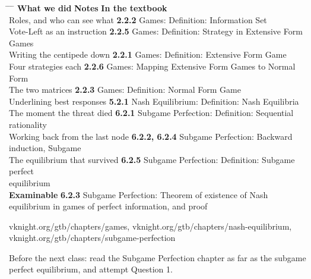 \hspace{0.3cm}
\begin{minipage}{0.95\linewidth}
\begin{tabbing}
\hspace{6.9cm} \= \hspace{3.0cm} \= \hspace{9.4cm} \= \kill
\textbf{What we did} \> {\color{inkteal}\textbf{Notes}} \> \textbf{In the textbook} \>
  \\[0.5em]
Roles, and who can see what \> {\color{inkteal}\textbf{2.2.2}} \> Games: Definition:
  Information Set \> \\[0.28em]
Vote-Left as an instruction \> {\color{inkteal}\textbf{2.2.5}} \> Games: Definition:
  Strategy in Extensive Form Games \> \\[0.28em]
Writing the centipede down \> {\color{inkteal}\textbf{2.2.1}} \> Games: Definition:
  Extensive Form Game \> \\[0.28em]
Four strategies each \> {\color{inkteal}\textbf{2.2.6}} \> Games: Mapping Extensive
  Form Games to Normal Form \> \\[0.28em]
The two matrices \> {\color{inkteal}\textbf{2.2.3}} \> Games: Definition: Normal Form
  Game \> \\[0.28em]
Underlining best responses \> {\color{inkteal}\textbf{5.2.1}} \> Nash Equilibrium:
  Definition: Nash Equilibria \> \\[0.28em]
The moment the threat died \> {\color{inkteal}\textbf{6.2.1}} \> Subgame Perfection:
  Definition: Sequential rationality \> \\[0.28em]
Working back from the last node \> {\color{inkteal}\textbf{6.2.2, 6.2.4}} \> Subgame
  Perfection: Backward induction, Subgame \> \\[0.28em]
The equilibrium that survived \> {\color{inkteal}\textbf{6.2.5}} \> Subgame
  Perfection: Definition: Subgame perfect \> \\
\> \> equilibrium \> \\[0.28em]
\textbf{Examinable} \> {\color{inkteal}\textbf{6.2.3}} \> Subgame Perfection: Theorem
  of existence of Nash \> \\
\> \> equilibrium in games of perfect information, and proof \> 
\end{tabbing}
\end{minipage}

\vspace{0.3cm}

{\color{inkgrey} vknight.org/gtb/chapters/games,
\; vknight.org/gtb/chapters/nash-equilibrium,
\; vknight.org/gtb/chapters/subgame-perfection}

\vspace{0.2cm}

{\large Before the next class: read the Subgame Perfection chapter as far as the
subgame perfect equilibrium, and attempt Question 1.}



